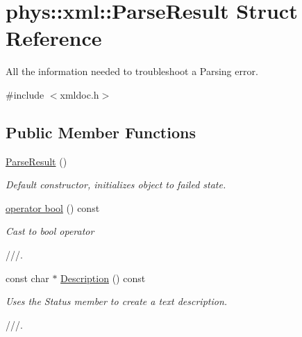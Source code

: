 \hypertarget{structphys_1_1xml_1_1ParseResult}{
\section{phys::xml::ParseResult Struct Reference}
\label{d5/dea/structphys_1_1xml_1_1ParseResult}
}


All the information needed to troubleshoot a Parsing error.  




{\ttfamily \#include $<$xmldoc.h$>$}

\subsection*{Public Member Functions}
\begin{DoxyCompactItemize}
\item 
\hypertarget{structphys_1_1xml_1_1ParseResult_aa7520df050e866122a0cf67bf306e323}{
\hyperlink{structphys_1_1xml_1_1ParseResult_aa7520df050e866122a0cf67bf306e323}{ParseResult} ()}
\label{d5/dea/structphys_1_1xml_1_1ParseResult_aa7520df050e866122a0cf67bf306e323}

\begin{DoxyCompactList}\small\item\em Default constructor, initializes object to failed state. \item\end{DoxyCompactList}\item 
\hyperlink{structphys_1_1xml_1_1ParseResult_a95c9989865c1bace7846995166a13e31}{operator bool} () const 
\begin{DoxyCompactList}\small\item\em Cast to bool operator \par
 ///. \item\end{DoxyCompactList}\item 
const char $\ast$ \hyperlink{structphys_1_1xml_1_1ParseResult_aeda9dd881b93496c5500cb810b2e937d}{Description} () const 
\begin{DoxyCompactList}\small\item\em Uses the Status member to create a text description. \par
 ///. \item\end{DoxyCompactList}\end{DoxyCompactItemize}

